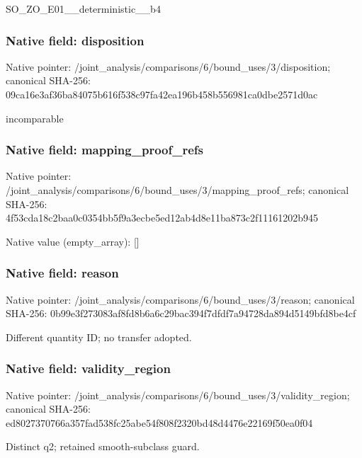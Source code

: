 \documentclass[10pt,a4paper]{article}
\begin{document}
\begingroup\raggedright\sloppy SO\_\allowbreak{}ZO\_\allowbreak{}E01\_\allowbreak{}\_\allowbreak{}deterministic\_\allowbreak{}\_\allowbreak{}b4\par\endgroup

\subsubsection{Native field: disposition}
Native pointer: /joint\_\allowbreak{}analysis/comparisons/6/bound\_\allowbreak{}uses/3/disposition; canonical SHA-256: 09ca16e3af36ba84075b616f538c97fa42ea196b458b556981ca0dbe2571d0ac

\begingroup\raggedright\sloppy incomparable\par\endgroup

\subsubsection{Native field: mapping\_\allowbreak{}proof\_\allowbreak{}refs}
Native pointer: /joint\_\allowbreak{}analysis/comparisons/6/bound\_\allowbreak{}uses/3/mapping\_\allowbreak{}proof\_\allowbreak{}refs; canonical SHA-256: 4f53cda18c2baa0c0354bb5f9a3ecbe5ed12ab4d8e11ba873c2f11161202b945

Native value (empty\_\allowbreak{}array): []

\subsubsection{Native field: reason}
Native pointer: /joint\_\allowbreak{}analysis/comparisons/6/bound\_\allowbreak{}uses/3/reason; canonical SHA-256: 0b99e3f273083af8fd8b6a6c29bac394f7dfdf7a94728da894d5149bfd8be4cf

\begingroup\raggedright\sloppy Different quantity ID;\allowbreak{} no transfer adopted.\par\endgroup

\subsubsection{Native field: validity\_\allowbreak{}region}
Native pointer: /joint\_\allowbreak{}analysis/comparisons/6/bound\_\allowbreak{}uses/3/validity\_\allowbreak{}region; canonical SHA-256: ed8027370766a357fad538fc25abe54f808f2320bd48d4476e22169f50ea0f04

\begingroup\raggedright\sloppy Distinct q2;\allowbreak{} retained smooth-subclass guard.\par\endgroup
\end{document}
